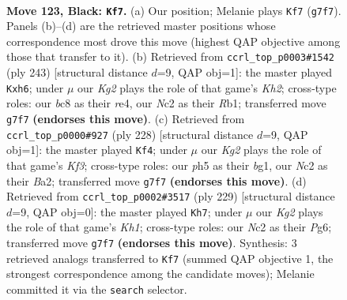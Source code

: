 \documentclass[11pt]{article}
\begin{document}
\clearpage

\begin{figure}[p]\centering
\begin{subfigure}{0.46\textwidth}\centering
\resizebox{\linewidth}{!}{%
\newchessgame
\chessboard[
  setfen={2B5/6k1/8/6PP/8/8/2n4K/8 b - - 16 123},
  showmover=false,
  pgfstyle=straightmove, color=movearrow, markmove={g7-f7}
]}
\caption{}
\end{subfigure}\hfill
\begin{subfigure}{0.46\textwidth}\centering
\resizebox{\linewidth}{!}{%
\newchessgame
\chessboard[
  setfen={8/5K1k/7P/5P2/4R3/8/8/1r6 b - - 96 122},
  showmover=false,
  pgfstyle=straightmove, color=movearrow, markmove={h7-h6}
]}
\caption{}
\end{subfigure}
\\[4pt]
\begin{subfigure}{0.46\textwidth}\centering
\resizebox{\linewidth}{!}{%
\newchessgame
\chessboard[
  setfen={8/4k3/8/4Pp2/8/5K2/B7/6b1 w - - 3 115},
  showmover=false,
  pgfstyle=straightmove, color=movearrow, markmove={f3-f4}
]}
\caption{}
\end{subfigure}\hfill
\begin{subfigure}{0.46\textwidth}\centering
\resizebox{\linewidth}{!}{%
\newchessgame
\chessboard[
  setfen={5K1k/8/6p1/8/B6P/7P/8/8 b - - 74 115},
  showmover=false,
  pgfstyle=straightmove, color=movearrow, markmove={h8-h7}
]}
\caption{}
\end{subfigure}
\caption{\textbf{Move 123, Black: \texttt{Kf7}.} (a) Our position; Melanie plays \texttt{Kf7} (\texttt{g7f7}). Panels (b)--(d) are the retrieved master positions whose correspondence most drove this move (highest QAP objective among those that transfer to it). (b) Retrieved from \texttt{ccrl\_top\_p0003\#1542} (ply 243) [structural distance $d$=9, QAP obj=1]: the master played \texttt{Kxh6}; under $\mu$ our \emph{Kg2} plays the role of that game's \emph{Kh2}; cross-type roles: our \emph{b}c8 as their \emph{r}e4, our \emph{N}c2 as their \emph{R}b1; transferred move \texttt{g7f7} \textbf{(endorses this move)}. (c) Retrieved from \texttt{ccrl\_top\_p0000\#927} (ply 228) [structural distance $d$=9, QAP obj=1]: the master played \texttt{Kf4}; under $\mu$ our \emph{Kg2} plays the role of that game's \emph{Kf3}; cross-type roles: our \emph{p}h5 as their \emph{b}g1, our \emph{N}c2 as their \emph{B}a2; transferred move \texttt{g7f7} \textbf{(endorses this move)}. (d) Retrieved from \texttt{ccrl\_top\_p0002\#3517} (ply 229) [structural distance $d$=9, QAP obj=0]: the master played \texttt{Kh7}; under $\mu$ our \emph{Kg2} plays the role of that game's \emph{Kh1}; cross-type roles: our \emph{N}c2 as their \emph{P}g6; transferred move \texttt{g7f7} \textbf{(endorses this move)}. Synthesis: 3 retrieved analogs transferred to \texttt{Kf7} (summed QAP objective 1, the strongest correspondence among the candidate moves); Melanie committed it via the \texttt{search} selector.}
\label{fig:thought-m245}
\end{figure}
\end{document}
